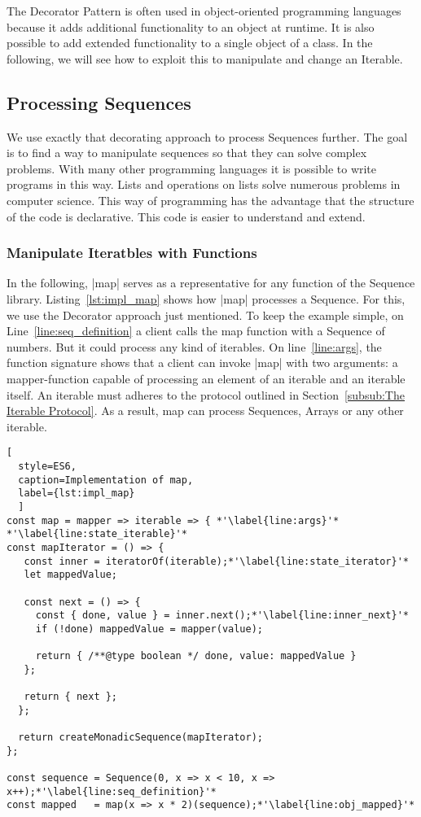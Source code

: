 The Decorator Pattern is often used in object-oriented programming languages 
because it adds additional functionality to an object at runtime. It is also 
possible to add extended functionality to a single object of a class. In the 
following, we will see how to exploit this to manipulate and change an Iterable.

\subsection{Processing Sequences}
\label{sec:Processing Sequences}
We use exactly that decorating approach to process Sequences further. 
The goal is to find a way to manipulate sequences so that they can solve 
complex problems. With many other programming languages it is possible to write
programs in this way. Lists and operations on lists solve numerous problems in 
computer science. This way of programming has the advantage that the structure 
of the code is declarative. This code is easier to understand and extend.

\subsubsection{Manipulate Iteratbles with Functions}

In the following, |map| serves as a representative for any function of the
Sequence library.
Listing~\ref{lst:impl_map} shows how |map| processes a Sequence. 
For this, we use the Decorator approach just mentioned. To keep the example 
simple, on Line~\ref{line:seq_definition} a client calls the map function with a Sequence of numbers. But it
could process any kind of iterables.
\newline
On line~\ref{line:args}, the function signature shows that a client can invoke 
|map| with two arguments: a mapper-function capable of processing an element of
an iterable and an iterable itself. An iterable must adheres to the protocol outlined in 
Section~\ref{subsub:The Iterable Protocol}. As a result, map can process 
Sequences, Arrays or any other iterable. 

\begin{lstlisting}[
  style=ES6, 
  caption=Implementation of map,
  label={lst:impl_map}
  ]
const map = mapper => iterable => { *'\label{line:args}'*
*'\label{line:state_iterable}'*
const mapIterator = () => {
   const inner = iteratorOf(iterable);*'\label{line:state_iterator}'*
   let mappedValue;
 
   const next = () => {
     const { done, value } = inner.next();*'\label{line:inner_next}'*
     if (!done) mappedValue = mapper(value);
 
     return { /**@type boolean */ done, value: mappedValue }
   };
 
   return { next };
  };
 
  return createMonadicSequence(mapIterator);
};

const sequence = Sequence(0, x => x < 10, x => x++);*'\label{line:seq_definition}'*
const mapped   = map(x => x * 2)(sequence);*'\label{line:obj_mapped}'*
\end{lstlisting}

